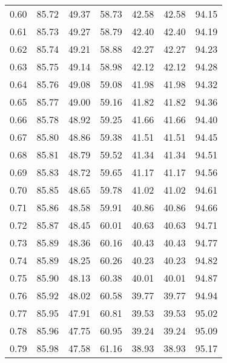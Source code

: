 \begin{tabular}{|c|c|c|c|c|c|c|}
      0.60 &     85.72 &     49.37 &      58.73 &   42.58 &      42.58 &         94.15 \\
      0.61 &     85.73 &     49.27 &      58.79 &   42.40 &      42.40 &         94.19 \\
      0.62 &     85.74 &     49.21 &      58.88 &   42.27 &      42.27 &         94.23 \\
      0.63 &     85.75 &     49.14 &      58.98 &   42.12 &      42.12 &         94.28 \\
      0.64 &     85.76 &     49.08 &      59.08 &   41.98 &      41.98 &         94.32 \\
      0.65 &     85.77 &     49.00 &      59.16 &   41.82 &      41.82 &         94.36 \\
      0.66 &     85.78 &     48.92 &      59.25 &   41.66 &      41.66 &         94.40 \\
      0.67 &     85.80 &     48.86 &      59.38 &   41.51 &      41.51 &         94.45 \\
      0.68 &     85.81 &     48.79 &      59.52 &   41.34 &      41.34 &         94.51 \\
      0.69 &     85.83 &     48.72 &      59.65 &   41.17 &      41.17 &         94.56 \\
      0.70 &     85.85 &     48.65 &      59.78 &   41.02 &      41.02 &         94.61 \\
      0.71 &     85.86 &     48.58 &      59.91 &   40.86 &      40.86 &         94.66 \\
      0.72 &     85.87 &     48.45 &      60.01 &   40.63 &      40.63 &         94.71 \\
      0.73 &     85.89 &     48.36 &      60.16 &   40.43 &      40.43 &         94.77 \\
      0.74 &     85.89 &     48.25 &      60.26 &   40.23 &      40.23 &         94.82 \\
      0.75 &     85.90 &     48.13 &      60.38 &   40.01 &      40.01 &         94.87 \\
      0.76 &     85.92 &     48.02 &      60.58 &   39.77 &      39.77 &         94.94 \\
      0.77 &     85.95 &     47.91 &      60.81 &   39.53 &      39.53 &         95.02 \\
      0.78 &     85.96 &     47.75 &      60.95 &   39.24 &      39.24 &         95.09 \\
      0.79 &     85.98 &     47.58 &      61.16 &   38.93 &      38.93 &         95.17 \\

\end{tabular}
